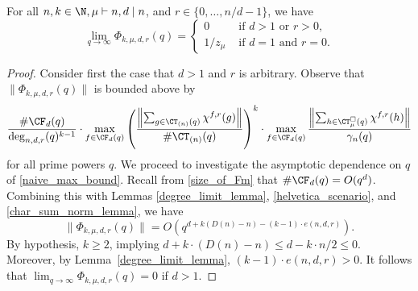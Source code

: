 \begin{lemma}
\label{Phi_behavior}
For all \(n,k \in \N, \mu \vdash n, d \mid n\), and \(r \in \{0,\ldots,n/d-1\}\), we have
\begin{equation}
\lim_{q \to \infty}
\Phi_{k,\mu,d,r} (q)
=
\begin{cases}
0         & \text{ if } d > 1 \text{ or }  r > 0, \\
1 / z_\mu & \text{ if } d = 1 \text{ and } r = 0.
\end{cases}
\end{equation}
\end{lemma}

\begin{proof}
Consider first the case that \(d > 1\) and \(r\) is arbitrary.
Observe that
\(
\|
\Phi_{k,\mu,d,r} (q)
\|
\)
is bounded above by
\begin{equation}
\label{naive_max_bound}
\frac{
\# \CF_d (q)
}{
\deg_{n,d,r} (q)^{k-1}
}
\cdot
\max_{f \in \CF_d (q)}
\left (
\frac{\left \| \sum_{g \in \CT_{(n)}(q)} \chi^{f,r}(g) \right \|}{\# \CT_{(n)}(q)}
\right )^k
\cdot
\max_{f \in \CF_d(q)}
\frac{\left \| \sum_{h \in \CT^\Box_\mu(q)} \chi^{f,r}(h) \right \|}{\gamma_n(q)}
\end{equation}
for all prime powers \(q\).
We proceed to investigate the asymptotic dependence on \(q\) of \eqref{naive_max_bound}.
Recall from \eqref{size_of_Fm} that \(\# \CF_d (q) = O(q^d)\).
Combining this with Lemmas \ref{degree_limit_lemma},
\ref{helvetica_scenario},
and
\ref{char_sum_norm_lemma},
we have
\begin{equation}
\| \Phi_{k,\mu,d,r} (q) \|
=
O \left ( q^{d + k (D(n) - n) - (k-1) \cdot e(n,d,r)} \right ).
\end{equation}
By hypothesis, \(k \geq 2\), implying \(d  + k \cdot (D(n) - n) \leq d - k \cdot n/2 \leq 0\).
Moreover, by Lemma~\ref{degree_limit_lemma}, \((k-1)\cdot e(n,d,r) > 0\).
It follows that \(\lim_{q \to \infty} \Phi_{k,\mu,d,r} (q) = 0\) if \(d > 1\).


\end{proof}
